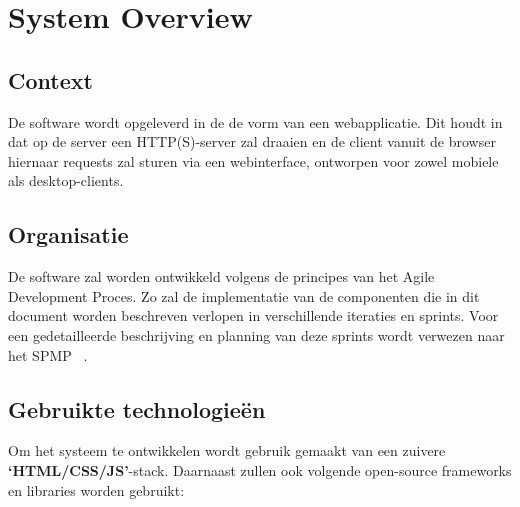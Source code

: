 \documentclass{article}
\begin{document}
\clearpage

\section{System Overview} %

\subsection{Context}

De software wordt opgeleverd in de de vorm van een webapplicatie. Dit houdt in dat op de server een HTTP(S)-server zal draaien en de client vanuit de browser hiernaar requests zal sturen via een webinterface, ontworpen voor zowel mobiele als desktop-clients.

\subsection{Organisatie}

De software zal worden ontwikkeld volgens de principes van het Agile Development Proces. Zo zal de implementatie van de componenten die in dit document worden beschreven verlopen in verschillende iteraties en sprints. Voor een gedetailleerde beschrijving en planning van deze sprints wordt verwezen naar het SPMP ~\cite{Xtreport:SPMP}.

\subsection{Gebruikte technologie\"en}

Om het systeem te ontwikkelen wordt gebruik gemaakt van een zuivere \textbf{`HTML/CSS/JS'}-stack.
Daarnaast zullen ook volgende open-source frameworks en libraries worden gebruikt:
\end{document}
